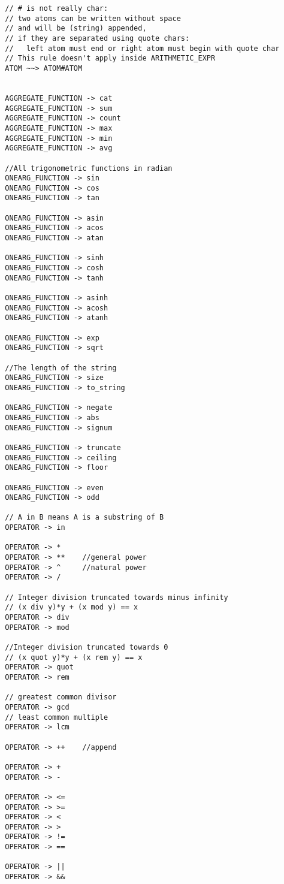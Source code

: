 \begin{verbatim}
  // # is not really char:
  // two atoms can be written without space 
  // and will be (string) appended, 
  // if they are separated using quote chars:
  //   left atom must end or right atom must begin with quote char
  // This rule doesn't apply inside ARITHMETIC_EXPR
  ATOM ~~> ATOM#ATOM     

  
  AGGREGATE_FUNCTION -> cat
  AGGREGATE_FUNCTION -> sum
  AGGREGATE_FUNCTION -> count
  AGGREGATE_FUNCTION -> max
  AGGREGATE_FUNCTION -> min
  AGGREGATE_FUNCTION -> avg
  
  //All trigonometric functions in radian
  ONEARG_FUNCTION -> sin
  ONEARG_FUNCTION -> cos
  ONEARG_FUNCTION -> tan
  
  ONEARG_FUNCTION -> asin
  ONEARG_FUNCTION -> acos
  ONEARG_FUNCTION -> atan
  
  ONEARG_FUNCTION -> sinh
  ONEARG_FUNCTION -> cosh
  ONEARG_FUNCTION -> tanh
  
  ONEARG_FUNCTION -> asinh
  ONEARG_FUNCTION -> acosh
  ONEARG_FUNCTION -> atanh
  
  ONEARG_FUNCTION -> exp
  ONEARG_FUNCTION -> sqrt
  
  //The length of the string
  ONEARG_FUNCTION -> size
  ONEARG_FUNCTION -> to_string
  
  ONEARG_FUNCTION -> negate
  ONEARG_FUNCTION -> abs
  ONEARG_FUNCTION -> signum
  
  ONEARG_FUNCTION -> truncate
  ONEARG_FUNCTION -> ceiling
  ONEARG_FUNCTION -> floor
  
  ONEARG_FUNCTION -> even
  ONEARG_FUNCTION -> odd
  
  // A in B means A is a substring of B
  OPERATOR -> in
  
  OPERATOR -> *
  OPERATOR -> **    //general power
  OPERATOR -> ^     //natural power
  OPERATOR -> /
  
  // Integer division truncated towards minus infinity
  // (x div y)*y + (x mod y) == x
  OPERATOR -> div
  OPERATOR -> mod
  
  //Integer division truncated towards 0
  // (x quot y)*y + (x rem y) == x  
  OPERATOR -> quot
  OPERATOR -> rem

  // greatest common divisor
  OPERATOR -> gcd
  // least common multiple
  OPERATOR -> lcm
  
  OPERATOR -> ++    //append
  
  OPERATOR -> +
  OPERATOR -> -
  
  OPERATOR -> <=
  OPERATOR -> >=
  OPERATOR -> <
  OPERATOR -> >
  OPERATOR -> !=
  OPERATOR -> ==
  
  OPERATOR -> ||
  OPERATOR -> &&
\end{verbatim}

